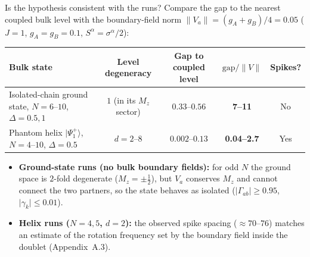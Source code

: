 \documentclass[aspectratio=169,11pt]{beamer}
\newcommand{\ket}[1]{\lvert #1\rangle}
\begin{document}
\begin{frame}{Is the hypothesis consistent with the runs?}
\small
Compare the gap to the nearest coupled bulk level with the boundary-field norm $\lVert V_a\rVert=(g_A+g_B)/4=0.05$ ($J=1$, $g_A=g_B=0.1$, $S^\alpha=\sigma^\alpha/2$):
\smallskip
\begin{center}
\footnotesize
\begin{tabular}{@{}>{\raggedright\arraybackslash}p{4.6cm}cccc@{}}
\toprule
Bulk state & Level degeneracy & Gap to coupled level & $\text{gap}/\lVert V\rVert$ & Spikes? \\\midrule
Isolated-chain ground state, $N=6$--$10$, $\Delta=0.5,1$ & $1$ (in its $M_z$ sector) & $0.33$--$0.56$ & \textbf{7--11} & No\\[4pt]
Phantom helix $\ket{\Psi_1^+}$, $N=4$--$10$, $\Delta=0.5$ & $d=2$--$8$ & $0.002$--$0.13$ & \textbf{0.04--2.7} & Yes\\\bottomrule
\end{tabular}
\end{center}
\smallskip
\begin{itemize}\footnotesize\setlength\itemsep{3.5pt}
\item \textbf{Ground-state runs (no bulk boundary fields):} for odd $N$ the ground space is $2$-fold degenerate ($M_z=\pm\tfrac12$), but $V_a$ conserves $M_z$ and cannot connect the two partners, so the state behaves as isolated ($\lvert\Gamma_{ab}\rvert\ge0.95$, $\lvert\gamma_k\rvert\le0.01$).
\item \textbf{Helix runs ($N=4,5$, $d=2$):} the observed spike spacing ($\approx70$--$76$) matches an estimate of the rotation frequency set by the boundary field inside the doublet (Appendix~A.3).
\end{itemize}
\smallskip
\begin{center}
\end{center}
\end{frame}
\end{document}
